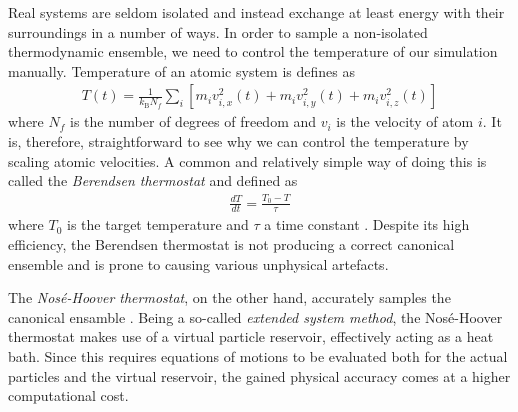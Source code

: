 Real systems are seldom isolated and instead exchange at least energy with their surroundings in a number of ways. 
In order to sample a non-isolated thermodynamic ensemble, we need to control the temperature of our simulation manually. 
Temperature of an atomic system is defines as
\begin{align}
T(t) = \frac{1}{k_{\text{B}}N_f}\sum_{i}\left[ m_iv_{i,x}^2(t) + m_iv_{i,y}^2(t) + m_iv_{i,z}^2(t)\right]
\end{align}
where $N_f$ is the number of degrees of freedom and $v_{i}$ is the velocity of atom $i$. 
It is, therefore, straightforward to see why we can control the temperature by scaling atomic velocities.
A common and relatively simple way of doing this is called the \textit{Berendsen thermostat} and defined as
\begin{align}
\frac{dT}{dt} = \frac{T_0-T}{\tau}
\end{align}
where $T_0$ is the target temperature and $\tau$ a time constant \cite{berendsen1984molecular}. 
Despite its high efficiency, the Berendsen thermostat is not producing a correct canonical ensemble and is prone to causing various unphysical artefacts.

The \textit{Nos\'{e}-Hoover thermostat}, on the other hand, accurately samples the canonical ensamble \cite{nose1984unified}. 
Being a so-called \textit{extended system method}, the Nos\'{e}-Hoover thermostat makes use of a virtual particle reservoir, effectively acting as a heat bath. 
Since this requires equations of motions to be evaluated both for the actual particles and the virtual reservoir, the gained physical accuracy comes at a higher computational cost.

